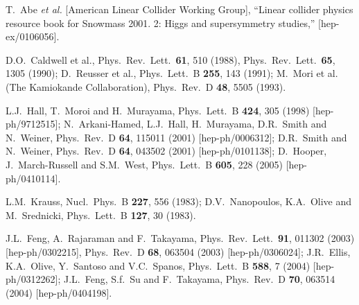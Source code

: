 \documentclass[12pt]{article}
\begin{document}
\begin{thebibliography}{999}
T.~Abe {\it et al.}  [American Linear Collider Working Group],
  ``Linear collider physics resource book for Snowmass 2001. 2: Higgs and
  supersymmetry studies,''
  [hep-ex/0106056].

D.O.~Caldwell et al., 
  Phys.\ Rev.\ Lett.\  {\bf 61}, 510 (1988),
  Phys.\ Rev.\ Lett.\  {\bf 65}, 1305 (1990);
D.~Reusser et al., 
  Phys.\ Lett.\ B {\bf 255}, 143 (1991);
M.~Mori et al. (The Kamiokande Collaboration),
  Phys.\ Rev.\ D {\bf 48}, 5505 (1993).

L.J.~Hall, T.~Moroi and H.~Murayama,
  Phys.\ Lett.\ B {\bf 424}, 305 (1998)
  [hep-ph/9712515];
N.~Arkani-Hamed, L.J.~Hall, H.~Murayama, D.R.~Smith and N.~Weiner,
  Phys.\ Rev.\ D {\bf 64}, 115011 (2001)
  [hep-ph/0006312];
D.R.~Smith and N.~Weiner,
  Phys.\ Rev.\ D {\bf 64}, 043502 (2001)
  [hep-ph/0101138];
D.~Hooper, J.~March-Russell and S.M.~West,
  Phys.\ Lett.\ B {\bf 605}, 228 (2005)
  [hep-ph/0410114].
    
L.M.~Krauss,
  Nucl.\ Phys.\ B {\bf 227}, 556 (1983);
D.V.~Nanopoulos, K.A.~Olive and M.~Srednicki,
  Phys.\ Lett.\ B {\bf 127}, 30 (1983).

J.L.~Feng, A.~Rajaraman and F.~Takayama,
  Phys.\ Rev.\ Lett.\  {\bf 91}, 011302 (2003)
  [hep-ph/0302215],
  Phys.\ Rev.\ D {\bf 68}, 063504 (2003)
  [hep-ph/0306024];
J.R.~Ellis, K.A.~Olive, Y.~Santoso and V.C.~Spanos,
  Phys.\ Lett.\ B {\bf 588}, 7 (2004)
  [hep-ph/0312262];
J.L.~Feng, S.f.~Su and F.~Takayama,
  Phys.\ Rev.\ D {\bf 70}, 063514 (2004)
  [hep-ph/0404198].


\end{thebibliography}
\end{document}
